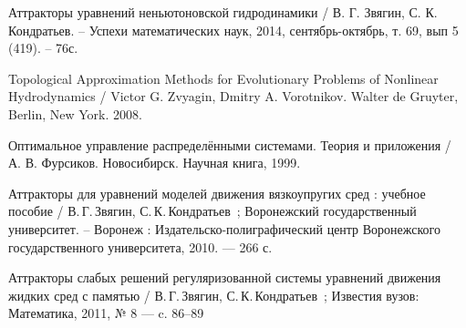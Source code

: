 \begin{thebibliography}{99}

 Аттракторы уравнений неньютоновской гидродинамики / В. Г. Звягин, С. К. Кондратьев. – Успехи математических наук, 2014, сентябрь-октябрь, т. 69, вып 5 (419). – 76с.

 Topological Approximation Methods for Evolutionary Problems of Nonlinear Hydrodynamics / Victor G. Zvyagin, Dmitry A. Vorotnikov. Walter de Gruyter, Berlin, New York. 2008.

 Оптимальное управление распределёнными системами. Теория и приложения / А. В. Фурсиков. Новосибирск. Научная книга, 1999.

 Аттракторы для уравнений моделей движения вязкоупругих сред : учебное пособие / В.\,Г.\,Звягин, С.\,К.\,Кондратьев~; Воронежский государственный университет. -- Воронеж : Издательско-полиграфический центр Воронежского государственного университета, 2010. --- 266 с.

 Аттракторы слабых решений регуляризованной системы уравнений движения жидких сред с памятью / В.\,Г.\,Звягин, С.\,К.\,Кондратьев~; Известия вузов: Математика, 2011, № 8 --- c. 86–89

\end{thebibliography}


